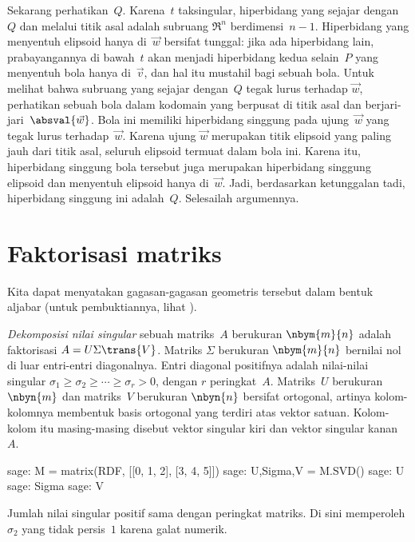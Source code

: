 Sekarang perhatikan~$Q$.
Karena~$t$ taksingular, hiperbidang yang sejajar dengan~$Q$ dan melalui titik
asal adalah subruang $\Re^n$ berdimensi~$n-1$.
Hiperbidang yang menyentuh elipsoid hanya di~$\vec{w}$ bersifat tunggal:
jika ada hiperbidang lain, prabayangannya di bawah~$t$ akan menjadi
hiperbidang kedua selain~$P$ yang menyentuh bola hanya di~$\vec{v}$, dan hal
itu mustahil bagi sebuah bola.
Untuk melihat bahwa subruang yang sejajar dengan~$Q$ tegak lurus terhadap
$\vec{w}$, perhatikan sebuah bola dalam kodomain yang berpusat di titik asal
dan berjari-jari~$\absval{\vec{w}}$.
Bola ini memiliki hiperbidang singgung pada ujung~$\vec{w}$ yang tegak lurus
terhadap~$\vec{w}$.
Karena ujung $\vec{w}$ merupakan titik elipsoid yang paling jauh dari titik
asal, seluruh elipsoid termuat dalam bola ini. Karena itu, hiperbidang
singgung bola tersebut juga merupakan hiperbidang singgung elipsoid dan
menyentuh elipsoid hanya di~$\vec{w}$.
Jadi, berdasarkan ketunggalan tadi, hiperbidang singgung ini adalah~$Q$.
Selesailah argumennya.



\section{Faktorisasi matriks}

Kita dapat menyatakan gagasan-gagasan geometris tersebut dalam bentuk
aljabar (untuk pembuktiannya, lihat \cite{TrefethenBau97}).

\textit{Dekomposisi nilai singular} sebuah matriks~$A$ berukuran
$\nbym{m}{n}$ adalah faktorisasi $A=U\Sigma\trans{V}$\!.
Matriks $\Sigma$ berukuran $\nbym{m}{n}$ bernilai nol di luar entri-entri
diagonalnya. Entri diagonal positifnya adalah nilai-nilai singular
$\sigma_1\geq\sigma_2\geq\cdots\geq\sigma_r>0$, dengan $r$ peringkat~$A$.
Matriks~$U$ berukuran $\nbyn{m}$ dan matriks~$V$ berukuran $\nbyn{n}$
bersifat ortogonal, artinya kolom-kolomnya membentuk basis ortogonal yang
terdiri atas vektor satuan. Kolom-kolom itu masing-masing disebut vektor
singular kiri dan vektor singular kanan~$A$.
\begin{sagecommandline}
sage: M = matrix(RDF, [[0, 1, 2], [3, 4, 5]])
sage: U,Sigma,V = M.SVD()
sage: U
sage: Sigma
sage: V  
\end{sagecommandline}
Jumlah nilai singular positif sama dengan peringkat matriks.
Di sini \Sage{} memperoleh $\sigma_2$ yang tidak persis~\(1\) karena galat
numerik.

